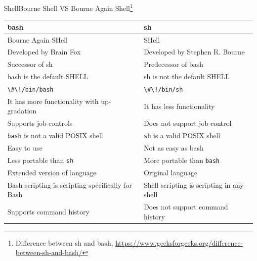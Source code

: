 \documentclass{beamer}
\begin{document}
    \begin{frame}{Shell}{Bourne Shell VS Bourne Again Shell\footnote{Difference between sh and bash, \url{https://www.geeksforgeeks.org/difference-between-sh-and-bash/}}}
        \begin{footnotesize}
            \begin{table}[h!]
                \centering
                \begin{tabular}{|p{5.5cm}|p{5.5cm}|}
                    \hline
                    \textbf{bash}                                     & \textbf{sh}                               \\ \hline
                    Bourne Again SHell                                & SHell                                     \\ \hline
                    Developed by Brain Fox                            & Developed by Stephen R. Bourne            \\ \hline
                    Successor of sh                                   & Predecessor of bash                       \\ \hline
                    bash is the default SHELL                         & sh is not the default SHELL               \\ \hline
                    \lstinline{\#\!/bin/bash}                         & \lstinline{\#\!/bin/sh}                   \\ \hline
                    It has more functionality with up-gradation       & It has less functionality                 \\ \hline
                    Supports job controls                             & Does not support job control              \\ \hline
                    \lstinline{bash} is not a valid POSIX shell       & \lstinline{sh} is a valid POSIX shell     \\ \hline
                    Easy to use                                       & Not as easy as bash                       \\ \hline
                    Less portable than \lstinline{sh}                 & More portable than \lstinline{bash}       \\ \hline
                    Extended version of language                      & Original language                         \\ \hline
                    Bash scripting is scripting specifically for Bash & Shell scripting is scripting in any shell \\ \hline
                    Supports command history                          & Does not support command history          \\ \hline
                \end{tabular}
            \end{table}
        \end{footnotesize}
    \end{frame}
\end{document}
